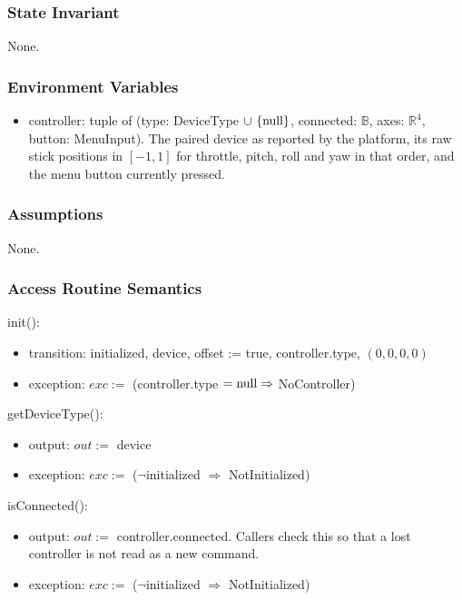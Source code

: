 \documentclass[12pt, titlepage]{article}
\newcommand{\True}{\textnormal{true}}
\newcommand{\nul}{\textnormal{null}}
\newcommand{\noinit}{$\neg$initialized $\Rightarrow$ NotInitialized}
\begin{document}
\subsubsection{State Invariant}

None.

\subsubsection{Environment Variables}

\begin{itemize}
\item controller: tuple of (type: DeviceType $\cup \ \{\nul\}$, connected:
  $\mathbb{B}$, axes: $\mathbb{R}^4$, button: MenuInput). The paired device as
  reported by the platform, its raw stick positions in $[-1, 1]$ for throttle,
  pitch, roll and yaw in that order, and the menu button currently pressed.
\end{itemize}

\subsubsection{Assumptions}

None.

\subsubsection{Access Routine Semantics}

\noindent init():
\begin{itemize}
\item transition: initialized, device, offset := \True, controller.type,
  $(0, 0, 0, 0)$
\item exception: $exc :=$ (controller.type $= \nul \Rightarrow$ NoController)
\end{itemize}

\noindent getDeviceType():
\begin{itemize}
\item output: $out :=$ device
\item exception: $exc :=$ (\noinit)
\end{itemize}

\noindent isConnected():
\begin{itemize}
\item output: $out :=$ controller.connected. Callers check this so that a
  lost controller is not read as a new command.
\item exception: $exc :=$ (\noinit)
\end{itemize}
\end{document}
